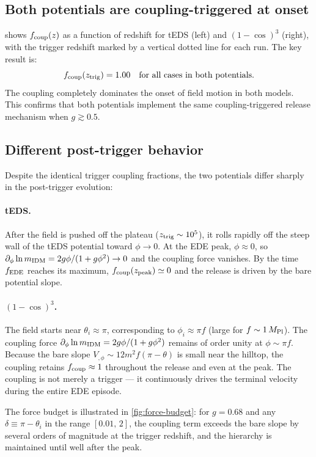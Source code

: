 \documentclass[aps,onecolumn,prd,nofootinbib,superscriptaddress,10pt,longbibliography,floatfix]{revtex4-2}
\newcommand{\mpl}{M_{\rm Pl}}
\newcommand{\fe}{f_{\rm EDE}}
\newcommand{\dlnm}{\partial_\phi \ln m_{\rm IDM}}
\newcommand{\fcoup}{f_{\rm coup}}
\begin{document}
\subsection{Both potentials are coupling-triggered at onset}

 shows $\fcoup(z)$ as a function of redshift for tEDS (left) and $(1-\cos)^3$ (right), with the trigger redshift marked by a vertical dotted line for each run. The key result is:
\begin{equation}
\fcoup(z_{\rm trig}) = 1.00 \quad\text{for all cases in both potentials.}
\end{equation}
The coupling completely dominates the onset of field motion in both models. This confirms that both potentials implement the same coupling-triggered release mechanism when $g\gtrsim 0.5$.

\subsection{Different post-trigger behavior}

Despite the identical trigger coupling fractions, the two potentials differ sharply in the post-trigger evolution:

\paragraph{tEDS.} After the field is pushed off the plateau ($z_{\rm trig}\sim 10^5$), it rolls rapidly off the steep wall of the tEDS potential toward $\phi\to 0$. At the EDE peak, $\phi\approx 0$, so $\dlnm = 2g\phi/(1+g\phi^2)\to 0$ and the coupling force vanishes. By the time $\fe$ reaches its maximum, $\fcoup(z_{\rm peak})\simeq 0$ and the release is driven by the bare potential slope.

\paragraph{$(1-\cos)^3$.} The field starts near $\theta_i\approx\pi$, corresponding to $\phi_i\approx\pi f$ (large for $f\sim 1\,\mpl$). The coupling force $\dlnm = 2g\phi/(1+g\phi^2)$ remains of order unity at $\phi\sim\pi f$. Because the bare slope $V_{,\phi}\sim 12m^2f(\pi-\theta)$ is small near the hilltop, the coupling retains $\fcoup\approx 1$ throughout the release and even at the peak. The coupling is not merely a trigger — it continuously drives the terminal velocity during the entire EDE episode.

The force budget is illustrated in \cref{fig:force-budget}: for $g=0.68$ and any $\delta\equiv\pi-\theta_i$ in the range $[0.01,\,2]$, the coupling term exceeds the bare slope by several orders of magnitude at the trigger redshift, and the hierarchy is maintained until well after the peak.
\end{document}
